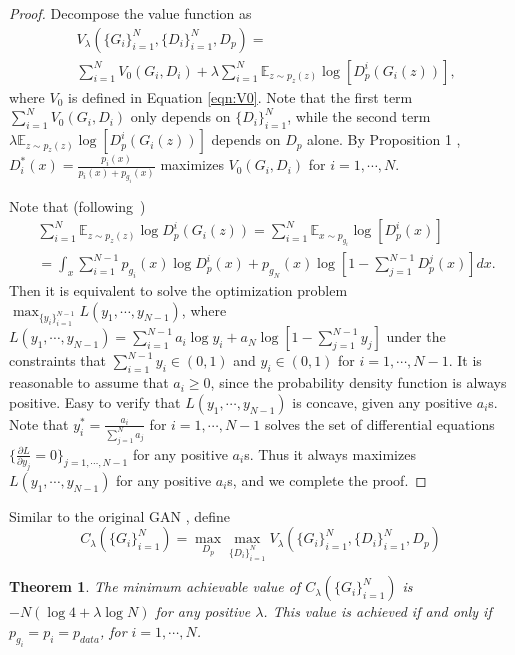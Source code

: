 \documentclass{article}
\newtheorem{theorem}{Theorem}
\begin{document}
\begin{proof}
Decompose the value function as 
\begin{align*}
    &V_\lambda(\{G_i\}_{i=1}^N,\{D_i\}_{i=1}^N, D_p)=\\ &\sum\limits_{i=1}^NV_0(G_i,D_i)+ \lambda \sum\limits_{i=1}^N\mathbb{E}_{z\sim p_{z}(z)}\log[D_p^i(G_i(z))],
\end{align*}
where $V_0$ is defined in Equation \eqref{eqn:V0}. Note that the first term $\sum\limits_{i=1}^NV_0(G_i,D_i)$ only depends on $\{D_i\}_{i=1}^N$, while the second term $\lambda \mathbb{E}_{z\sim p_{z}(z)}\log[D_p^i(G_i(z))]$ depends on $D_p$ alone. By Proposition 1 \cite{goodfellow2014generative}, $D_i^{*}(x) = \frac{p_i(x)}{p_i(x)+p_{g_i}(x)}$ maximizes $V_0(G_i,D_i)$ for $i=1,\cdots,N$. 

Note that (following~\cite{goodfellow2014generative}) 
\begin{align*}
&\sum\limits_{i=1}^N\mathbb{E}_{z\sim p_{z}(z)}\log D_p^i(G_i(z))=\sum\limits_{i=1}^N\mathbb{E}_{x\sim p_{g_i}}\log[D_p^i(x)]\\
&=\int_{x}\sum\limits_{i=1}^{N-1}p_{g_i}(x)\log D_p^i(x)+p_{g_N}(x)\log[1-\sum\limits_{j=1}^{N-1}D_p^j(x)]dx. 
\end{align*}
Then it is equivalent to solve the optimization problem $\max_{\{y_i\}_{i=1}^{N-1}}L(y_1,\cdots,y_{N-1})$, where $L(y_1,\cdots,y_{N-1})=\sum\limits_{i=1}^{N-1}a_i\log y_i+a_N\log[1-\sum\limits_{j=1}^{N-1}y_j]$ under the constraints that $\sum\limits_{i=1}^{N-1}y_i\in(0,1)$ and $y_i\in(0,1)$ for $i=1,\cdots,N-1$. It is reasonable to assume that $a_i\ge 0$, since the probability density function is always positive. Easy to verify that $L(y_1,\cdots,y_{N-1})$ is concave, given any positive $a_i$s. Note that $y_i^*=\frac{a_i}{\sum\limits_{j=1}^{N}a_j}$ for $i=1,\cdots,N-1$ solves the set of differential equations $\{\frac{\partial L}{\partial y_j}=0\}_{j=1,\cdots,N-1}$ for any positive $a_i$s. Thus it always maximizes $L(y_1,\cdots,y_{N-1})$ for any positive $a_i$s, and we complete the proof.
\end{proof} 


Similar to the original GAN \cite{goodfellow2014generative}, define 
\[C_\lambda(\{G_i\}_{i=1}^N)=\max_{D_p}\max_{\{D_i\}_{i=1}^N} V_\lambda(\{G_i\}_{i=1}^N,\{D_i\}_{i=1}^N, D_p)
\]
\begin{theorem} \label{thm:optimal:g} The minimum achievable value of $C_\lambda(\{G_i\}_{i=1}^N)$ is $-N(\log 4 +\lambda \log N)$ for any positive $\lambda$. This value is achieved if and only if $p_{g_i}=p_i=p_{data}$, for $i=1,\cdots, N$. \\
\end{theorem}
\end{document}

